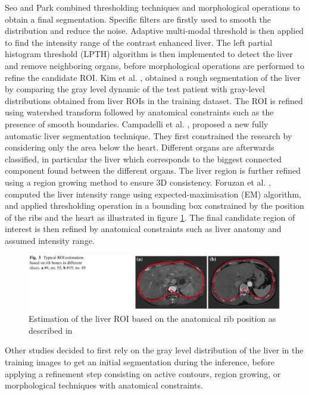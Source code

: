 \documentclass[]{article}
\begin{document}
	Seo and Park \cite{Seo2005} 
	combined thresholding techniques and morphological operations to obtain
	a final segmentation. Specific filters are firstly used to smooth the
	distribution and reduce the noise. Adaptive multi-modal threshold is
	then applied to find the intensity range of the contrast enhanced liver.
	The left partial histogram threshold (LPTH) algorithm is then
	implemented to detect the liver and remove neighboring organs, before
	morphological operations are performed to refine the candidate ROI.
	Kim et al. \cite{Kim2007}, obtained a rough segmentation of the liver by comparing the gray
	level dynamic of the test patient with gray-level distributions obtained
	from liver ROIs in the training dataset. The ROI is refined using
	watershed transform followed by anatomical constraints such as the
	presence of smooth boundaries.
	Campadelli et al. \cite{Campadelli2009}, proposed a new fully automatic liver segmentation
	technique. They first constrained the research by considering only the
	area below the heart. Different organs are afterwards classified, in
	particular the liver which corresponds to the biggest connected
	component found between the different organs. The liver region is
	further refined using a region growing method to ensure 3D consistency.
	Foruzan et al. \cite{Foruzan2009}, computed the liver intensity range using
	expected-maximisation (EM) algorithm, and applied thresholding operation
	in a bounding box constrained by the position of the ribs and the heart
	as illustrated in figure \ref{ForuzanFig3}. The final candidate region of interest is then
	refined by anatomical constraints such as liver anatomy and assumed
	intensity range.
	
	\begin{figure} [ht!]
		\centering
		\label{ForuzanFig3}
		\includegraphics[width=0.7\linewidth]{images/image1}
		\caption{Estimation of the liver ROI based on the anatomical rib position as described in \cite{Foruzan2009}}
	\end{figure}
	
	
	Other studies decided to first rely on the gray level distribution of
	the liver in the training images to get an initial segmentation during
	the inference, before applying a refinement step consisting on active
	contours, region growing, or morphological techniques with anatomical
	constraints.
	
\end{document}
